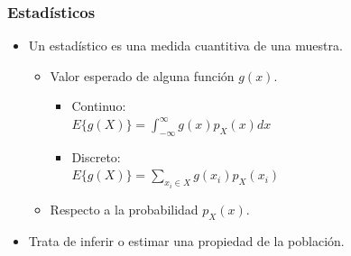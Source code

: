 \documentclass{beamer}
\numberwithin{section}{part}
\begin{document}
\begin{frame}\frametitle{Estadísticos}
    \begin{itemize}
      \item Un \alert{estadístico} es una medida cuantitiva de una muestra.
      \begin{itemize}
        \item Valor esperado de alguna función $g(x)$.
        \begin{itemize}
          \vspace{0.1cm}
          \item \alert{Continuo:} \hspace{0.1cm}\\\vspace{0.1cm}$E\{g(X)\}=\int_{-\infty}^{\infty}g(x) p_X(x)dx$
          \vspace{0.1cm}
          \item \alert{Discreto:}\\\vspace{0.1cm}$E\{g(X)\}=\sum_{x_i \in X} g(x_i)p_X(x_i)$
        \end{itemize}
      \item Respecto a la probabilidad $p_X(x)$.
      \end{itemize}
      \item Trata de inferir o estimar una propiedad de la población.
    \end{itemize}
    \footnotesize
\end{frame}
  
\end{document}
